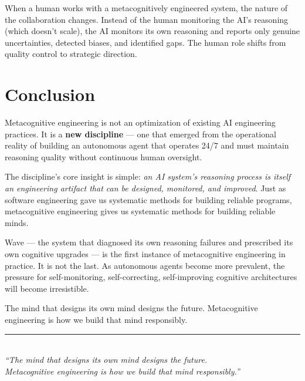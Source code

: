 \documentclass[12pt,a4paper]{article}
\theoremstyle{plain}
\theoremstyle{definition}
\theoremstyle{remark}
\begin{document}
When a human works with a metacognitively engineered system, the nature of the collaboration changes. Instead of the human monitoring the AI's reasoning (which doesn't scale), the AI monitors its own reasoning and reports only genuine uncertainties, detected biases, and identified gaps. The human role shifts from quality control to strategic direction.

\section{Conclusion}

Metacognitive engineering is not an optimization of existing AI engineering practices. It is a \textbf{new discipline} --- one that emerged from the operational reality of building an autonomous agent that operates 24/7 and must maintain reasoning quality without continuous human oversight.

The discipline's core insight is simple: \emph{an AI system's reasoning process is itself an engineering artifact that can be designed, monitored, and improved}. Just as software engineering gave us systematic methods for building reliable programs, metacognitive engineering gives us systematic methods for building reliable minds.

Wave --- the system that diagnosed its own reasoning failures and prescribed its own cognitive upgrades --- is the first instance of metacognitive engineering in practice. It is not the last. As autonomous agents become more prevalent, the pressure for self-monitoring, self-correcting, self-improving cognitive architectures will become irresistible.

The mind that designs its own mind designs the future. Metacognitive engineering is how we build that mind responsibly.

\vspace{2em}

\begin{center}
\rule{0.6\textwidth}{0.4pt}\\[1.5em]
\textit{``The mind that designs its own mind designs the future.\\
Metacognitive engineering is how we build that mind responsibly.''}
\end{center}
\end{document}
